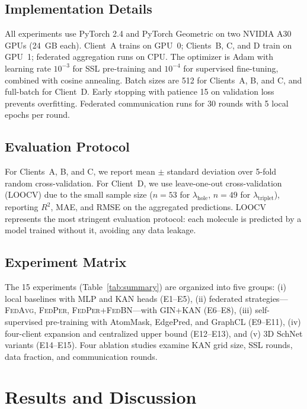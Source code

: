 \documentclass[twocolumn]{article}
\newcommand{\lamhole}{\lambda_{\text{hole}}}
\newcommand{\lamtrip}{\lambda_{\text{triplet}}}
\newcommand{\Rsq}{R^{2}}
\newcommand{\FedPer}{\textsc{FedPer}}
\newcommand{\FedBN}{\textsc{FedBN}}
\newcommand{\FedAvg}{\textsc{FedAvg}}
\begin{document}
\subsection{Implementation Details}\label{sec:implementation}

All experiments use PyTorch 2.4 and PyTorch Geometric on two NVIDIA A30 GPUs (24~GB each).
Client~A trains on GPU~0; Clients~B, C, and D train on GPU~1; federated aggregation runs on CPU.
The optimizer is Adam with learning rate $10^{-3}$ for SSL pre-training and $10^{-4}$ for supervised fine-tuning, combined with cosine annealing.
Batch sizes are 512 for Clients~A, B, and C, and full-batch for Client~D.
Early stopping with patience 15 on validation loss prevents overfitting.
Federated communication runs for 30 rounds with 5 local epochs per round.

\subsection{Evaluation Protocol}\label{sec:evaluation}

For Clients~A, B, and C, we report mean $\pm$ standard deviation over 5-fold random cross-validation.
For Client~D, we use leave-one-out cross-validation (LOOCV) due to the small sample size ($n = 53$ for $\lamhole$, $n = 49$ for $\lamtrip$), reporting $\Rsq$, MAE, and RMSE on the aggregated predictions.
LOOCV represents the most stringent evaluation protocol: each molecule is predicted by a model trained without it, avoiding any data leakage.

\subsection{Experiment Matrix}\label{sec:exp_matrix}

The 15 experiments (Table~\ref{tab:summary}) are organized into five groups: (i) local baselines with MLP and KAN heads (E1--E5), (ii) federated strategies---\FedAvg{}, \FedPer{}, \FedPer{}+\FedBN{}---with GIN+KAN (E6--E8), (iii) self-supervised pre-training with AtomMask, EdgePred, and GraphCL (E9--E11), (iv) four-client expansion and centralized upper bound (E12--E13), and (v) 3D SchNet variants (E14--E15).
Four ablation studies examine KAN grid size, SSL rounds, data fraction, and communication rounds.


\section{Results and Discussion}\label{sec:results}
\end{document}
